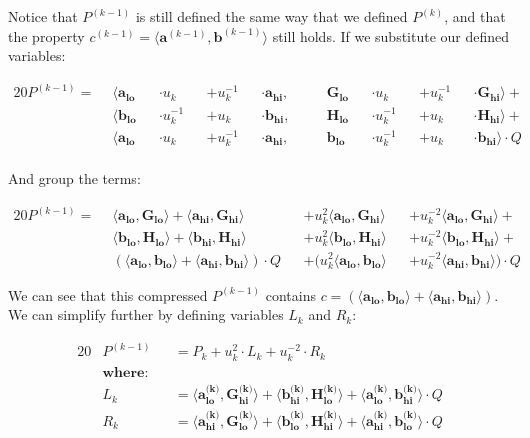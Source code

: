 \documentclass{article}
\newcommand{\eq}[1]{\begin{alignat*}{20}#1\end{alignat*}}
\renewcommand{\vec}[1]{\boldsymbol{#1}}
\newcommand{\dotp}[2]{\langle #1, #2 \rangle}
\newcommand{\opn}[1]{\operatorname{#1}}
\newcommand{\veclo}[1]{\vec{#1_{\opn{lo}}}}
\newcommand{\vechi}[1]{\vec{#1_{\opn{hi}}}}
\begin{document}
Notice that $P^{(k-1)}$ is still defined the same way
that we defined $P^{(k)}$, and that the property $c^{(k-1)} =
\dotp{\vec{a}^{(k-1)}}{\vec{b}^{(k-1)}}$ still holds. If we substitute
our defined variables:

\eq{
	P^{(k-1)} = \: \:
	&\dotp
		{        \veclo{a} &&\cdot u_k      &&+ u_k^{-1} &&\cdot \vechi{a}}
		{&&\quad \veclo{G} &&\cdot u_k      &&+ u_k^{-1} &&\cdot \vechi{G}}
	+ \\
	&\dotp
		{        \veclo{b} &&\cdot u_k^{-1} &&+ u_k      &&\cdot \vechi{b}}
		{&&\quad \veclo{H} &&\cdot u_k^{-1} &&+ u_k      &&\cdot \vechi{H}}
	+ \\
	&\dotp
		{        \veclo{a} &&\cdot u_k      &&+ u_k^{-1} &&\cdot \vechi{a}}
		{&&\quad \veclo{b} &&\cdot u_k^{-1} &&+ u_k      &&\cdot \vechi{b}}
	\cdot Q \\
}

And group the terms:

\eq{
	P^{(k-1)} = \: \:
	        &\dotp{\veclo{a}}{\veclo{G}}            +
	         \dotp{\vechi{a}}{\vechi{G}}          &&+
	u^2_k    \dotp{\veclo{a}}{\vechi{G}}          &&+
	u^{-2}_k \dotp{\veclo{a}}{\vechi{G}}            +\\
	        &\dotp{\veclo{b}}{\veclo{H}}            +
	         \dotp{\vechi{b}}{\vechi{H}}          &&+
	u^2_k    \dotp{\veclo{b}}{\vechi{H}}          &&+
	u^{-2}_k \dotp{\veclo{b}}{\vechi{H}}            +\\
	       &(\dotp{\veclo{a}}{\veclo{b}}            +
		       \dotp{\vechi{a}}{\vechi{b}}) \cdot Q &&+
	(u^2_k   \dotp{\veclo{a}}{\veclo{b}}          &&+
	u^{-2}_k \dotp{\vechi{a}}{\vechi{b}}) \cdot Q
}

We can see that this compressed $P^{(k-1)}$ contains $c =
(\dotp{\veclo{a}}{\veclo{b}} + \dotp{\vechi{a}}{\vechi{b}})$. We can
simplify further by defining variables $L_k$ and $R_k$:

\eq{
	&P^{(k-1)} &&= P_k + u^2_k \cdot L_k + u^{-2}_k \cdot R_k \\
	&\textbf{where:} \\
	&L_k     &&= \dotp{\veclo{a^{\text{(k)}}}}{\vechi{G^{\text{(k)}}}} +
	             \dotp{\vechi{b^{\text{(k)}}}}{\veclo{H^{\text{(k)}}}} + 
	             \dotp{\veclo{a^{\text{(k)}}}}{\vechi{b^{\text{(k)}}}} \cdot Q \\
	&R_k     &&= \dotp{\vechi{a^{\text{(k)}}}}{\veclo{G^{\text{(k)}}}} +
	             \dotp{\veclo{b^{\text{(k)}}}}{\vechi{H^{\text{(k)}}}} +
	             \dotp{\vechi{a^{\text{(k)}}}}{\veclo{b^{\text{(k)}}}} \cdot Q \\
}
\end{document}
